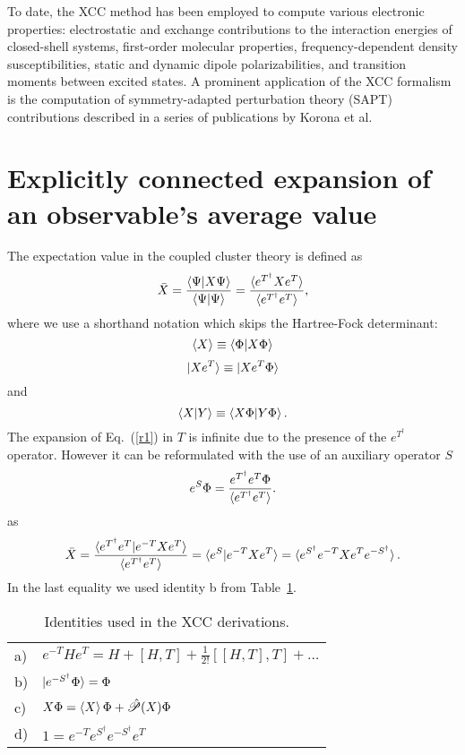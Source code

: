 \documentclass[preprint,12pt]{elsarticle}
\newcommand{\comute}[2]{ [ #1,#2]}
\newcommand{\equ}[1]{\begin{equation} #1 \end{equation}}
\newcommand{\equl}[2]{\begin{equation}\label{#2} #1 \end{equation}}
\newcommand{\fr}[1]{Eq.~(\ref{#1})}
\newcommand{\Frt}[1]{Table~\ref{#1}}
\newcommand{\etd}{e^{T^\dagger}}
\newcommand{\esd}{e^{S^\dagger}}
\newcommand{\esdm}{e^{-S^\dagger}}
\newcommand{\etm}{e^{-T}}
\newcommand{\et}{e^{T}}
\begin{document}
 To date, the XCC method\cite{jeziorski1993explicitly} has been employed to compute various electronic properties: electrostatic\cite{moszynski1993many} and exchange\cite{moszynski1994many}
contributions to the interaction energies of closed-shell systems, first-order molecular properties,\cite{korona2006one}  frequency-dependent density susceptibilities,\cite{korona2008dispersion} static and dynamic dipole polarizabilities, \cite{korona2006time}
and transition moments between
excited states.\cite{tucholska2014transition, tucholska2017transition} 
A prominent application of the XCC formalism
is the computation of symmetry-adapted perturbation theory (SAPT) contributions described in a series of publications by
Korona et al.\cite{korona2008first, korona2008second, korona2008dispersion, korona2009exchange} 
\section{Explicitly connected expansion of an observable's  average value}
The expectation value in the coupled cluster theory is defined as
\equl{ \bar{X} = \frac{\braket{\Psi|X\Psi}}{\braket{\Psi|\Psi}} = \frac{\braket{\etd X\et}}{\braket{\etd\et}},
}{r1}
where we use a shorthand notation which skips the Hartree-Fock determinant:
\equ{
  \braket{X} \equiv \braket{\Phi|X\Phi}
}
\equ{\ket{Xe^T} \equiv \ket{Xe^T\Phi}
  }
and
\equ{
  \braket{X|Y} \equiv \braket{X\Phi|Y\Phi}.
}
The expansion of \fr{r1} in $T$ is infinite 
due to 
the presence of the $\etd$ operator. However it can be reformulated with the use of an auxiliary operator $S$\cite{arponen1983variational, jeziorski1993explicitly}
\equl{e^S\Phi = \frac{\etd \et \Phi}{\braket{\etd\et}}.
}{r3}
as
\equl{ \bar{X} = \frac{\braket{\etd \et |\etm X \et}}{\braket{\etd\et}} = \braket{e^S|\etm X\et} = \braket{\esd\etm X \et\esdm}.
}{r2}
In the last equality we used identity b from \Frt{facts}.
\begin{table}[!bt]
  \begin{center}
    \caption{Identities used in the XCC derivations.}\label{facts}
  \begin{tabular}{l l}
    \toprule
a)&   $e^{-T}H e^{T} = H + \comute{H}{T} + \frac{1}{2!}\comute{\comute{H}{T}}{T}+ \ldots$\\[7pt]
   b)& $\ket{\esdm \Phi}=\Phi$\\[7pt]
    c)&$X\Phi = \braket{X}\Phi + \hat{\mathscr{P}}(X)\Phi$\\[7pt]
    d)&$1=\etm\esd\esdm\et$\\[7pt]
    \bottomrule
\end{tabular}
\end{center}
\end{table}
\end{document}
